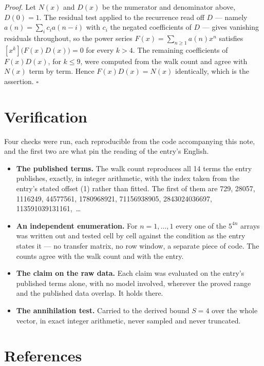 \documentclass[11pt]{article}
\theoremstyle{definition}
\begin{document}
{\itshape Proof.} Let $N(x)$ and $D(x)$ be the numerator and denominator above, $D(0)=1$. The residual test applied to the recurrence read off $D$ --- namely $a(n) = \sum_i c_i a(n-i)$ with $c_i$ the negated coefficients of $D$ --- gives vanishing residuals throughout, so the power series $F(x)=\sum_{n\ge 1}a(n)x^n$ satisfies $[x^k]\bigl(F(x)D(x)\bigr) = 0$ for every $k > 4$. The remaining coefficients of $F(x)D(x)$, for $k \le 9$, were computed from the walk count and agree with $N(x)$ term by term. Hence $F(x)D(x) = N(x)$ identically, which is the assertion. $\square$

\section{Verification}

Four checks were run, each reproducible from the code accompanying this note, and the first two are what pin the reading of the entry's English.

\begin{itemize}

\item {\bfseries The published terms.} The walk count reproduces all 14 terms the entry publishes, exactly, in integer arithmetic, with the index taken from the entry's stated offset (1) rather than fitted. The first of them are 729, 28057, 1116249, 44577561, 1780968921, 71156938905, 2843024036697, 113591039131161,~\dots

\item {\bfseries An independent enumeration.} For $n = 1,\dots,1$ every one of the $5^{4n}$ arrays was written out and tested cell by cell against the condition as the entry states it --- no transfer matrix, no row window, a separate piece of code. The counts agree with the walk count and with the entry.

\item {\bfseries The claim on the raw data.} Each claim was evaluated on the entry's published terms alone, with no model involved, wherever the proved range and the published data overlap. It holds there.

\item {\bfseries The annihilation test.} Carried to the derived bound $S = 4$ over the whole vector, in exact integer arithmetic, never sampled and never truncated.

\end{itemize}

\section{References}
\end{document}
